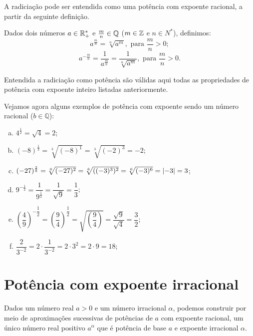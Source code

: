  A radiciação pode ser entendida como uma potência com expoente racional, a partir da seguinte definição.
 \vskip0.3cm

 \colorbox{azul}{
 \begin{minipage}{0.9\linewidth}
 \begin{center}
  Dados dois números $a \in \mathbb{R}^{*}_{+}$ e $\frac{m}{n} \in \mathbb{Q}$ ($m \in \mathbb{Z}$ e $n \in N^{*}$), definimos:
 \[a^{\frac{m}{n}}= \sqrt[n]{a^m}, \text{ para } \frac{m}{n} >0 ;\]
 \[a^{-\frac{m}{n}}= \frac{1}{a^{\frac{m}{n}}}= \frac{1}{\sqrt[n]{a^m}},  \text{ para } \frac{m}{n} >0.\]
 \end{center}
 \end{minipage}}

 \vskip0.3cm

 Entendida a radiciação como potência são válidas aqui todas as propriedades de potência com expoente inteiro listadas anteriormente.

 \begin{exem}
  Vejamos agora alguns exemplos de potência com expoente sendo um número racional ($b \in \mathbb{Q}$):
  \begin{enumerate}[a)]
   \item $4^{\frac{1}{2}}= \sqrt{4}= 2$;
   \item $(-8)^{\frac{1}{3}}= \sqrt[3]{(-8)^1}= \sqrt[3]{(-2)^{3}}= -2$;
   \item $(-27)^{\frac{2}{6}}= \sqrt[6]{(-27)^2}= \sqrt[6]{((-3)^3)^2}= \sqrt[6]{(-3)^6} = \left|-3\right| = 3$;
   \item $9^{-\frac{1}{2}}= \dfrac{1}{9^{\frac{1}{2}}}= \dfrac{1}{\sqrt{9}}= \dfrac{1}{3}$;
   \item $\left(\dfrac{4}{9}\right)^{-\dfrac{1}{2}}= \left(\dfrac{9}{4}\right)^{\dfrac{1}{2}}= \sqrt{\left(\dfrac{9}{4}\right)}=\dfrac{\sqrt{9}}{\sqrt{4}}= \dfrac{3}{2}$;
   \item $\dfrac{2}{3^{-2}}= 2 \cdot \dfrac{1}{3^{-2}}= 2 \cdot 3^{2}= 2 \cdot 9= 18$;
  \end{enumerate}

 \end{exem}



 \section{Potência com expoente irracional}

 Dados um número real $a > 0$ e um número irracional $\alpha$, podemos construir por meio de aproximações sucessivas de potências de $a$ com expoente racional, um único número real positivo $a^{\alpha}$ que é potência de base $a$ e expoente irracional $\alpha$.

